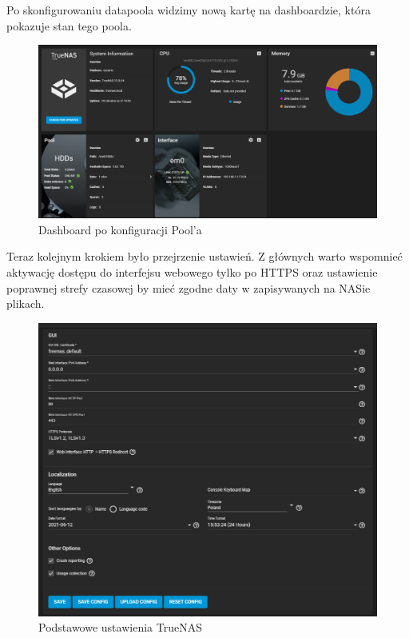 \documentclass[12pt,a4paper]{article}
\newcommand{\<}{\langle}
\renewcommand{\>}{\rangle}
\theoremstyle{definition}
\begin{document}
Po skonfigurowaniu datapoola widzimy nową kartę na dashboardzie, która pokazuje stan tego poola.

\begin{figure}[H]
    \centering
    \includegraphics[width=\linewidth]{img/ss_truenas/32.png}
    \caption{Dashboard po konfiguracji Pool'a}
    \label{dashboard_after_pool}
\end{figure}

Teraz kolejnym krokiem było przejrzenie ustawień. Z głównych warto wspomnieć aktywację dostępu do interfejsu webowego tylko po HTTPS oraz ustawienie poprawnej strefy czasowej by mieć zgodne daty w zapisywanych na NASie plikach.

\begin{figure}[H]
    \centering
    \includegraphics[width=\linewidth]{img/ss_truenas/33.png}
    \caption{Podstawowe ustawienia TrueNAS}
\end{figure}
\end{document}
